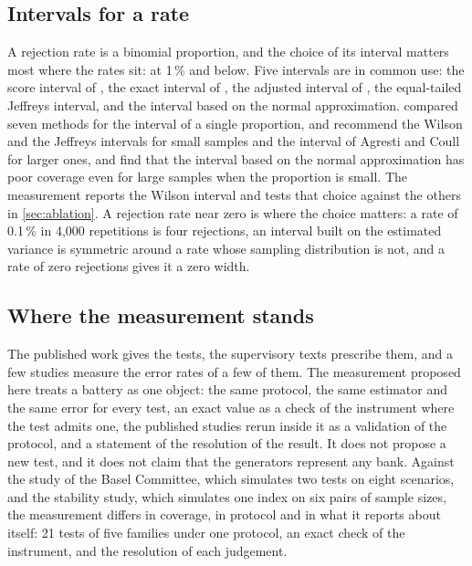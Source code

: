 \subsection{Intervals for a rate}
\label{sec:rw-intervals}

A rejection rate is a binomial proportion, and the choice of its interval matters most where the rates sit: at 1\,\% and below.
Five intervals are in common use: the score interval of \citet{wilson1927}, the exact interval of \citet{clopper1934}, the adjusted interval of \citet{agresti1998}, the equal-tailed Jeffreys interval, and the interval based on the normal approximation.
\citet{newcombe1998} compared seven methods for the interval of a single proportion, and \citet{brown2001} recommend the Wilson and the Jeffreys intervals for small samples and the interval of Agresti and Coull for larger ones, and find that the interval based on the normal approximation has poor coverage even for large samples when the proportion is small.
The measurement reports the Wilson interval and tests that choice against the others in \cref{sec:ablation}. A rejection rate near zero is where the choice matters: a rate of 0.1\,\% in 4,000 repetitions is four rejections, an interval built on the estimated variance is symmetric around a rate whose sampling distribution is not, and a rate of zero rejections gives it a zero width.

\subsection{Where the measurement stands}
\label{sec:rw-position}

The published work gives the tests, the supervisory texts prescribe them, and a few studies measure the error rates of a few of them.
The measurement proposed here treats a battery as one object: the same protocol, the same estimator and the same error for every test, an exact value as a check of the instrument where the test admits one, the published studies rerun inside it as a validation of the protocol, and a statement of the resolution of the result.
It does not propose a new test, and it does not claim that the generators represent any bank. Against the study of the Basel Committee, which simulates two tests on eight scenarios, and the stability study, which simulates one index on six pairs of sample sizes, the measurement differs in coverage, in protocol and in what it reports about itself: 21 tests of five families under one protocol, an exact check of the instrument, and the resolution of each judgement.
